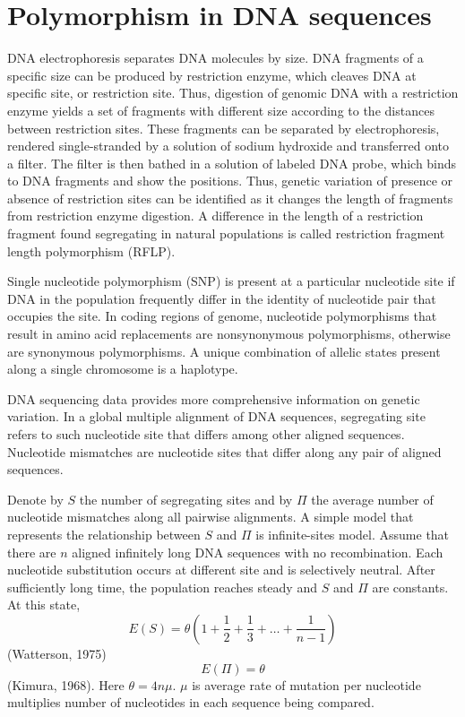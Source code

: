 \documentclass[11pt]{article}
\begin{document}
\begin{sloppypar}
\section{Polymorphism in DNA sequences}
DNA electrophoresis separates DNA molecules by size. 
DNA fragments of a specific size can be produced by restriction enzyme, which cleaves DNA at specific site, or restriction site. 
Thus, digestion of genomic DNA with a restriction enzyme yields a set of fragments with different size according to the distances between restriction sites. 
These fragments can be separated by electrophoresis, rendered single-stranded by a solution of sodium hydroxide and transferred onto a filter. 
The filter is then bathed in a solution of labeled DNA probe, which binds to DNA fragments and show the positions. 
Thus, genetic variation of presence or absence of restriction sites can be identified as it changes the length of fragments from restriction enzyme digestion. 
A difference in the length of a restriction fragment found segregating in natural populations is called restriction fragment length polymorphism (RFLP). 

\par

Single nucleotide polymorphism (SNP) is present at a particular nucleotide site if DNA in the population frequently differ in the identity of nucleotide pair that occupies the site. 
In coding regions of genome, nucleotide polymorphisms that result in amino acid replacements are nonsynonymous polymorphisms, otherwise are synonymous polymorphisms. 
A unique combination of allelic states present along a single chromosome is a haplotype. 

\par

DNA sequencing data provides more comprehensive information on genetic variation. 
In a global multiple alignment of DNA sequences, segregating site refers to such nucleotide site that differs among other aligned sequences. 
Nucleotide mismatches are nucleotide sites that differ along any pair of aligned sequences. 

\par

Denote by $S$ the number of segregating sites and by $\Pi$ the average number of nucleotide mismatches along all pairwise alignments. 
A simple model that represents the relationship between $S$ and $\Pi$ is infinite-sites model. 
Assume that there are $n$ aligned infinitely long DNA sequences with no recombination. 
Each nucleotide substitution occurs at different site and is selectively neutral. 
After sufficiently long time, the population reaches steady and $S$ and $\Pi$ are constants. 
At this state, 
\begin{equation}
  E(S)=\theta(1+\frac{1}{2}+\frac{1}{3}+\dots+\frac{1}{n-1})
\end{equation}
(Watterson, 1975) 
\begin{equation}
  E(\Pi)=\theta
\end{equation}
(Kimura, 1968). 
Here $\theta=4n\mu$. 
$\mu$ is average rate of mutation per nucleotide multiplies number of nucleotides in each sequence being compared. 



\end{sloppypar}
\end{document}
